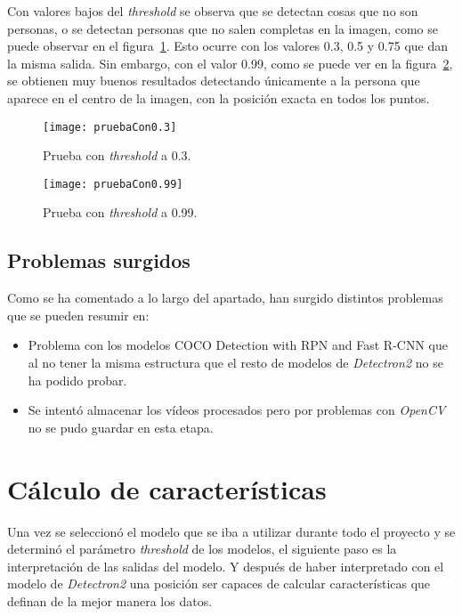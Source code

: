 Con valores bajos del \textit{threshold} se observa que se detectan cosas que no son personas, o se detectan personas que no salen completas en la imagen, como se puede observar en el figura~\ref{fig:pruebaCon0.3}. Esto ocurre con los valores 0.3, 0.5 y 0.75 que dan la misma salida. Sin embargo, con el valor 0.99, como se puede ver en la figura~\ref{fig:pruebaCon0.99}, se obtienen muy buenos resultados detectando únicamente a la persona que aparece en el centro de la imagen, con la posición exacta en todos los puntos.

\begin{figure}[h]
	\centering
	\texttt{[image: pruebaCon0.3]}
	\caption{Prueba con \textit{threshold} a 0.3.}
	\label{fig:pruebaCon0.3}
\end{figure}

\begin{figure}[h]
	\centering
	\texttt{[image: pruebaCon0.99]}
	\caption{Prueba con \textit{threshold} a 0.99.}
	\label{fig:pruebaCon0.99}
\end{figure}

\subsection{Problemas surgidos}
Como se ha comentado a lo largo del apartado, han surgido distintos problemas que se pueden resumir en:
\begin{itemize}
	\item Problema con los modelos COCO Detection with RPN and Fast R-CNN que al no tener la misma estructura que el resto de modelos de \textit{Detectron2} no se ha podido probar.
	\item Se intentó almacenar los vídeos procesados pero por problemas con \textit{OpenCV} no se pudo guardar en esta etapa.
\end{itemize}

\section{Cálculo de características}
Una vez se seleccionó el modelo que se iba a utilizar durante todo el proyecto y se determinó el parámetro \textit{threshold} de los modelos, el siguiente paso es la interpretación de las salidas del modelo. Y después de haber interpretado con el modelo de \textit{Detectron2} una posición ser capaces de calcular características que definan de la mejor manera los datos.
